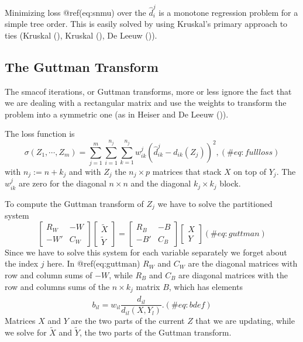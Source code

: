 \documentclass[
  12pt,
  letterpaper,
  DIV=11,
  numbers=noendperiod]{scrartcl}
\begin{document}
Minimizing loss @ref(eq:snmu) over the \(\hat d_i^j\) is a monotone
regression problem for a simple tree order. This is easily solved by
using Kruskal's primary approach to ties (Kruskal
(), Kruskal
(), De Leeuw
()).

\subsection{The Guttman Transform}\label{the-guttman-transform}

The smacof iterations, or Guttman transforms, more or less ignore the
fact that we are dealing with a rectangular matrix and use the weights
to transform the problem into a symmetric one (as in Heiser and De Leeuw
()).

The loss function is \begin{equation}
\sigma(Z_1,\cdots,Z_m)=\sum_{j=1}^m\sum_{i=1}^{n_j}\sum_{k=1}^{n_j}w_{ik}^j(\hat d_{ik}^j-d_{ik}(Z_j))^2,
(\#eq:fullloss)
\end{equation} with \(n_j:=n+k_j\) and with \(Z_j\) the \(n_j\times p\)
matrices that stack \(X\) on top of \(Y_j\). The \(w_{ik}^j\) are zero
for the diagonal \(n\times n\) and the diagonal \(k_j\times k_j\) block.

To compute the Guttman transform of \(Z_j\) we have to solve the
partitioned system \begin{equation}
\begin{bmatrix}
R_W&-W\\
-W'&C_W
\end{bmatrix}
\begin{bmatrix}\tilde X\\\tilde Y\end{bmatrix}=
\begin{bmatrix}
R_B&-B\\
-B'&C_B
\end{bmatrix}
\begin{bmatrix}X\\Y\end{bmatrix}
(\#eq:guttman)
\end{equation} Since we have to solve this system for each variable
separately we forget about the index \(j\) here. In @ref(eq:guttman)
\(R_W\) and \(C_W\) are the diagonal matrices with row and column sums
of \(-W\), while \(R_B\) and \(C_B\) are diagonal matrices with the row
and columns sums of the \(n\times k_j\) matrix \(B\), which has elements
\begin{equation}
b_{il}=w_{il}\frac{\hat d_{il}}{d_{il}(X,Y_l)}.
(\#eq:bdef)
\end{equation} Matrices \(X\) and \(Y\) are the two parts of the current
\(Z\) that we are updating, while we solve for \(\tilde X\) and
\(\tilde Y\), the two parts of the Guttman transform.
\end{document}
